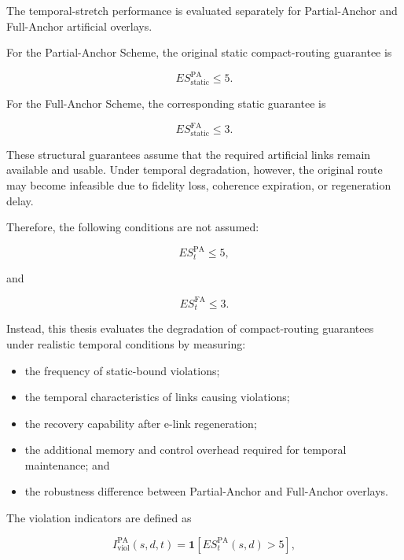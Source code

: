 The temporal-stretch performance is evaluated separately for Partial-Anchor and Full-Anchor artificial overlays.

For the Partial-Anchor Scheme, the original static compact-routing guarantee is

\begin{equation}
    ES_{\mathrm{static}}^{\mathrm{PA}}
    \leq
    5.
\end{equation}

For the Full-Anchor Scheme, the corresponding static guarantee is

\begin{equation}
    ES_{\mathrm{static}}^{\mathrm{FA}}
    \leq
    3.
\end{equation}

These structural guarantees assume that the required artificial links remain available and usable. Under temporal degradation, however, the original route may become infeasible due to fidelity loss, coherence expiration, or regeneration delay.

Therefore, the following conditions are not assumed:

\begin{equation}
    ES_t^{\mathrm{PA}}
    \leq
    5,
\end{equation}

and

\begin{equation}
    ES_t^{\mathrm{FA}}
    \leq
    3.
\end{equation}

Instead, this thesis evaluates the degradation of compact-routing guarantees under realistic temporal conditions by measuring:

\begin{itemize}
    \item the frequency of static-bound violations;
    \item the temporal characteristics of links causing violations;
    \item the recovery capability after e-link regeneration;
    \item the additional memory and control overhead required for temporal maintenance; and
    \item the robustness difference between Partial-Anchor and Full-Anchor overlays.
\end{itemize}

The violation indicators are defined as

\begin{equation}
    I_{\mathrm{viol}}^{\mathrm{PA}}(s,d,t)
    =
    \mathbf{1}
    \left[
    ES_t^{\mathrm{PA}}(s,d)
    >
    5
    \right],
\end{equation}

